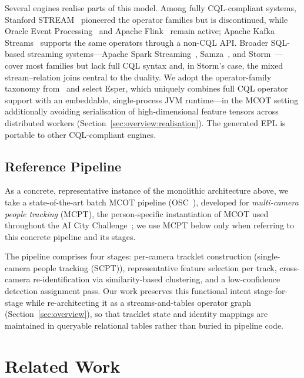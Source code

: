 \documentclass[5p,times]{elsarticle}
\begin{document}
Several engines realise parts of this model. Among fully CQL-compliant systems, Stanford
STREAM~\cite{DBLP:journals/debu/ArasuBBDIMNSTVW03} pioneered the operator families but is
discontinued, while Oracle Event Processing~\cite{alves2013getting} and Apache
Flink~\cite{apacheflink} remain active; Apache Kafka Streams~\cite{DBLP:conf/edbt/JafarpourD19}
supports the same operators through a non-CQL API. Broader SQL-based streaming systems---Apache
Spark Streaming~\cite{DBLP:conf/sigmod/ArmbrustDTYZX0S18}, Samza~\cite{10.14778/3137765.3137770},
and Storm~\cite{apachestorm}---cover most families but lack full CQL syntax and, in Storm's case,
the mixed stream--relation joins central to the duality. We adopt the operator-family taxonomy
from~\cite{awad2025best} and select Esper, which
uniquely combines full CQL operator support with an embeddable, single-process JVM runtime---in
the MCOT setting additionally avoiding serialisation of high-dimensional feature tensors across
distributed workers (Section~\ref{sec:overview:realisation}). The generated EPL is portable to
other CQL-compliant engines.






\subsection{Reference Pipeline}
\label{sec:background:baseline}

As a concrete, representative instance of the monolithic architecture above, we take a state-of-the-art batch MCOT pipeline (OSC~\cite{yoshida2024overlap}), developed for
\emph{multi-camera people tracking} (MCPT), the person-specific instantiation of MCOT used throughout the AI City Challenge~\cite{wang2024aicity}; we use MCPT below only when referring to this concrete pipeline and its stages.

The pipeline comprises four stages: per-camera tracklet construction (single-camera people tracking (SCPT)), representative feature selection per track, cross-camera re-identification via similarity-based clustering, and a low-confidence detection assignment pass. Our work preserves this functional intent stage-for-stage while re-architecting it as a streams-and-tables operator graph  (Section~\ref{sec:overview}), so that tracklet state and identity mappings are maintained in queryable relational tables rather than buried in pipeline
code.



\section{Related Work}\label{sec:related}
\end{document}

